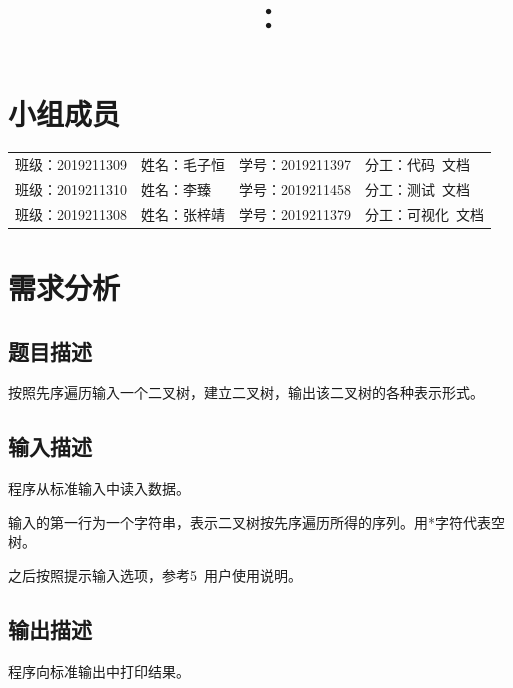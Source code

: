 \documentclass{article}
\title{\hmwkClass\ ：\hmwkTitle}
\author{\hmwkAuthorName}
\begin{document}
\maketitle

\section*{小组成员}

\setlength{\tabcolsep}{9mm}
{
    \begin{table}[htbp]
        \centering
        \begin{tabular}{llll}
            班级：2019211309 & 姓名：毛子恒 & 学号：2019211397 & 分工：代码\ 文档   \\

            班级：2019211310 & 姓名：李臻   & 学号：2019211458 & 分工：测试\ 文档   \\

            班级：2019211308 & 姓名：张梓靖 & 学号：2019211379 & 分工：可视化\ 文档 \\
        \end{tabular}
    \end{table}
}

\tableofcontents
\newpage

\section{需求分析}

\subsection{题目描述}

按照先序遍历输入一个二叉树，建立二叉树，输出该二叉树的各种表示形式。

\subsection{输入描述}

程序从标准输入中读入数据。

输入的第一行为一个字符串，表示二叉树按先序遍历所得的序列。用*字符代表空树。

之后按照提示输入选项，参考5\ 用户使用说明。

\subsection{输出描述}

程序向标准输出中打印结果。
\end{document}
